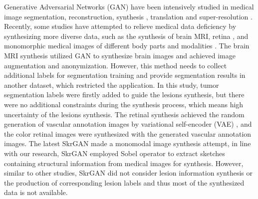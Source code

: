 \documentclass[runningheads]{llncs}
\begin{document}
	Generative Adversarial Networks (GAN) have been intensively studied in medical image segmentation\cite{40kamnitsas2017unsupervised}, reconstruction\cite{61fan2018a,65anirudh2018lose}, synthesis \cite{41costa2017towards,4shin2018medical,43iglesias2013is,44shrivastava2017learning}, translation \cite{2zhang2018translating,20nie2017medical,35osokin2017gans,36vannguyen2015crossdomain,40kamnitsas2017unsupervised,136yi2018sharpness-aware,137yang2018low-dose,138WolterinkGenerative} and super-resolution \cite{14You2018CT,15lyu2018super-resolution}.
	Recently, some studies have attempted to relieve medical data deficiency by synthesizing more diverse data, such as the synthesis of brain MRI\cite{4shin2018medical}, retina \cite{41costa2017towards}, and monomorphic medical images of different body parts and modalities \cite{96zhang2019skrgan:}. The brain MRI synthesis \cite{4shin2018medical} utilized GAN to synthesize brain images and achieved image augmentation and anonymization. However, this method needs to collect additional labels for segmentation training and provide segmentation results in another dataset, which restricted the application. In this study, tumor segmentation labels were firstly added to guide the lesions synthesis, but there were no additional constraints during the synthesis process, which means high uncertainty of the lesions synthesis. The retinal synthesis \cite{41costa2017towards} achieved the random generation of vascular annotation images by variational self-encoder (VAE) \cite{87kingma2014auto-encoding,88rezende2014stochastic}, and the color retinal images were synthesized with the generated vascular annotation images. The latest SkrGAN\cite{96zhang2019skrgan:} made a monomodal image synthesis attempt, in line with our research, SkrGAN employed Sobel operator to extract sketches containing structural information from medical images for synthesis. However, similar to other studies, SkrGAN did not consider lesion information synthesis or the production of corresponding lesion labels and thus most of the synthesized data is not available.
	
\end{document}
